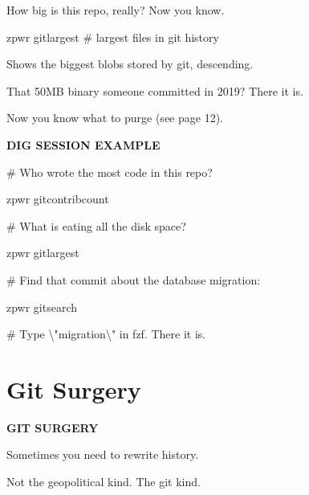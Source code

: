 \documentclass[11pt,a4paper,twoside]{book}
\begin{document}
How big is this repo, really? Now you know.

\begin{codebox}
zpwr gitlargest            \# largest files in git history\\
\end{codebox}

Shows the biggest blobs stored by git, descending.

That 50MB binary someone committed in 2019? There it is.

Now you know what to purge (see page 12).


\vspace{12pt}
{\bfseries\color{neonyellow} DIG SESSION EXAMPLE}\vspace{4pt}

\# Who wrote the most code in this repo?

\begin{codebox}
zpwr gitcontribcount\\
\end{codebox}

\# What is eating all the disk space?

\begin{codebox}
zpwr gitlargest\\
\end{codebox}

\# Find that commit about the database migration:

\begin{codebox}
zpwr gitsearch\\
\end{codebox}

\# Type \textbackslash{}"migration\textbackslash{}" in fzf. There it is.


\vspace{16pt}

\section{Git Surgery}


\vspace{10pt}
{\large\bfseries\color{neoncyan} GIT SURGERY}\vspace{6pt}

Sometimes you need to rewrite history.

\begin{codebox}
Not the geopolitical kind. The git kind.\\
\end{codebox}
\end{document}
